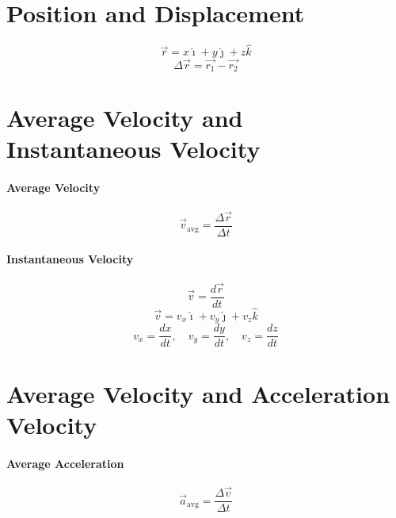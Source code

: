 \documentclass{article}
\begin{document}
    \section{Position and Displacement}

        \begin{equation}
            \vec{r} = x \hat{\imath} + y \hat{\jmath} + z \hat{k}
        \end{equation}
        \begin{equation}
            \Delta \vec{r} = \vec{r_1} - \vec{r_2}
        \end{equation}

    \section{Average Velocity and Instantaneous Velocity}

        \paragraph{Average Velocity}
        \begin{equation}
            \vec{v}_\text{avg} = \frac{\Delta\vec{r}}{\Delta t}
        \end{equation}

        \paragraph{Instantaneous Velocity}
        \begin{equation}
            \vec{v} = \frac{d\vec{r}}{dt}
        \end{equation}
        \begin{equation}
            \vec{v} = v_x \hat{\imath} + v_y \hat{\jmath} + v_z \hat{k}
        \end{equation}
        \begin{equation}
            v_x = \frac{dx}{dt}, \quad v_y = \frac{dy}{dt}, \quad v_z = \frac{dz}{dt}
        \end{equation}

    \section{Average Velocity and Acceleration Velocity}

        \paragraph{Average Acceleration}
        \begin{equation}
            \vec{a}_\text{avg} = \frac{\Delta\vec{v}}{\Delta t}
        \end{equation}
\end{document}
